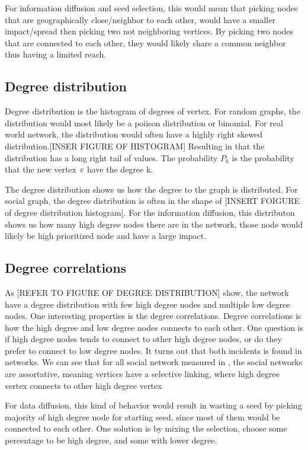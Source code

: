For information diffusion and seed selection, this would mean that picking nodes that are geographically close/neighbor to each other, would have a smaller impact/spread then picking two not neighboring vertices. By picking two nodes that are connected to each other, they would likely share a common neighbor thus having a limited reach.  

\subsection{Degree distribution}
Degree distribution is the histogram of degrees of vertex. For random graphs, the distribution would most likely be a poiison distribution or binomial. For real world network, the distribution would often have a highly right skewed distribution.[INSER FIGURE OF HISTOGRAM] Resulting in that the distribution has a long right tail of values. The probability $P_k$ is the probability that the new vertex $\it{v}$ have the degree k. 

The degree distribution shows us how the degree to the graph is distributed. For social graph, the degree distribution is often in the shape of [INSERT FOIGURE of degree distribution histogram]. For the information diffusion, this distributon shows us how many high degree nodes there are in the network, those node would likely be high prioritized node and have a large impact. 

\subsection{Degree correlations}
As [REFER TO FIGURE OF DEGREE DISTRIBUTION] show, the network have a degree distribution with few high degree nodes and multiple low degree nodes. One interesting properties is the degree correlations. Degree correlations is how the high degree and low degree nodes connects to each other. One question is if high degree nodes tends to connect to other high degree nodes, or do they prefer to connect to low degree nodes. It turns out that both incidents is found in networks\cite{complexNetwork}. We can see that for all social network measured in \cite{complexNetwork}, the social networks are assortative, meaning vertices have a selective linking, where high degree vertex connects to other high degree vertex\cite{AssortativeMixing2002} 

For data diffusion, this kind of behavior would result in wasting a seed by picking majority of high degree node for starting seed, since most of them would be connected to each other. One solution is by mixing the selection, choose some percentage to be high degree, and some with lower degree.


